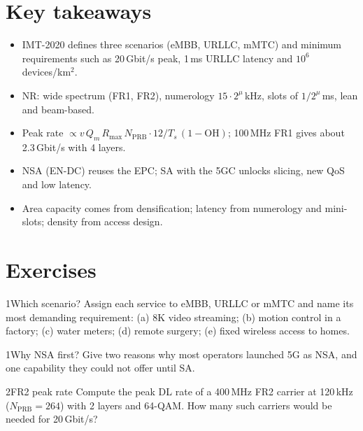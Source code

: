 \documentclass[11pt,a4paper]{article}
\begin{document}
\section{Key takeaways}
\begin{takeawaybox}
\begin{itemize}
  \item IMT-2020 defines three scenarios (eMBB, URLLC, mMTC) and minimum requirements such as 20\,Gbit/s peak,
        1\,ms URLLC latency and $10^6$ devices/km$^2$.
  \item NR: wide spectrum (FR1, FR2), numerology $15\cdot2^\mu$\,kHz, slots of $1/2^\mu$\,ms, lean and beam-based.
  \item Peak rate $\propto v\,Q_m\,R_{\max}\,N_{\mathrm{PRB}}\cdot12/T_s\,(1-\mathrm{OH})$; 100\,MHz FR1 gives about 2.3\,Gbit/s with 4 layers.
  \item NSA (EN-DC) reuses the EPC; SA with the 5GC unlocks slicing, new QoS and low latency.
  \item Area capacity comes from densification; latency from numerology and mini-slots; density from access design.
\end{itemize}
\end{takeawaybox}

\section{Exercises}

\begin{exercisebox}{1}{Which scenario?}\label{exr:scenario}
Assign each service to eMBB, URLLC or mMTC and name its most demanding requirement: (a) 8K video streaming;
(b) motion control in a factory; (c) water meters; (d) remote surgery; (e) fixed wireless access to homes.
\end{exercisebox}

\begin{exercisebox}{1}{Why NSA first?}\label{exr:nsa}
Give two reasons why most operators launched 5G as NSA, and one capability they could not offer until SA.
\end{exercisebox}

\begin{exercisebox}{2}{FR2 peak rate}\label{exr:fr2}
Compute the peak DL rate of a 400\,MHz FR2 carrier at 120\,kHz ($N_{\mathrm{PRB}} = 264$) with 2 layers and 64-QAM.
How many such carriers would be needed for 20\,Gbit/s?
\end{exercisebox}
\end{document}
